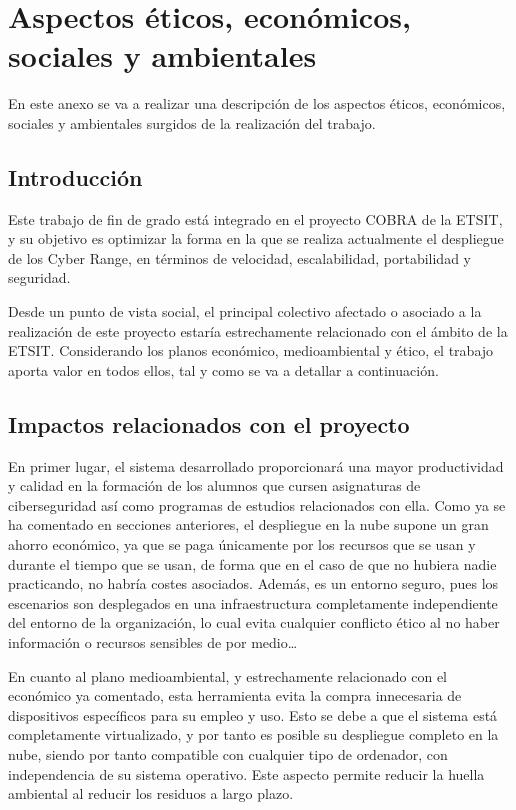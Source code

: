 \appendix
\clearpage
\addappheadtotoc
\appendixpage


\chapter{Aspectos éticos, económicos, sociales y ambientales } \label{anx:et}
  En este anexo se va a realizar una descripción de los aspectos éticos, económicos, sociales y ambientales surgidos de la realización del trabajo. 

\section*{Introducción}
  Este trabajo de fin de grado está integrado en el proyecto COBRA de la ETSIT, y su objetivo es optimizar la forma en la que se realiza actualmente el despliegue de los Cyber Range, en términos de velocidad, escalabilidad, portabilidad y seguridad. 

  Desde un punto de vista social, el principal colectivo afectado o asociado a la realización de este proyecto estaría estrechamente relacionado con el ámbito de la ETSIT. Considerando los planos económico, medioambiental y ético, el trabajo aporta valor en todos ellos, tal y como se va a detallar a continuación. 

\section*{Impactos relacionados con el proyecto}
  En primer lugar, el sistema desarrollado proporcionará una mayor productividad y calidad en la formación de los alumnos que cursen asignaturas de ciberseguridad así como programas de estudios relacionados con ella. Como ya se ha comentado en secciones anteriores, el despliegue en la nube supone un gran ahorro económico, ya que se paga únicamente por los recursos que se usan y durante el tiempo que se usan, de forma que en el caso de que no hubiera nadie practicando, no habría costes asociados. Además, es un entorno seguro, pues los escenarios son desplegados en una infraestructura completamente independiente del entorno de la organización, lo cual evita cualquier conflicto ético al no haber información o recursos sensibles de por medio\dots

  En cuanto al plano medioambiental, y estrechamente relacionado con el económico ya comentado, esta herramienta evita la compra innecesaria de dispositivos específicos para su empleo y uso. Esto se debe a que el sistema está completamente virtualizado, y por tanto es posible su despliegue completo en la nube, siendo por tanto compatible con cualquier tipo de ordenador, con independencia de su sistema operativo. Este aspecto permite reducir la huella ambiental al reducir los residuos a largo plazo.

